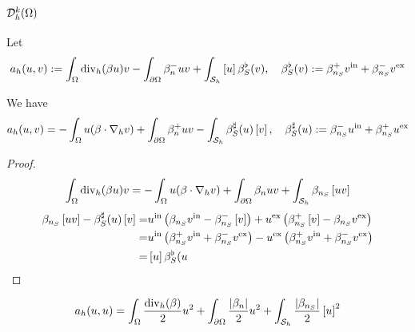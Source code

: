 \subsection{$\mathcal{D}^k_h(\Omega)$}\label{subsec:}
%
Let
%
\begin{equation}\label{eq:}
a_h(u,v) := \int_{\Omega}\operatorname{div}_h(\beta u) v - \int_{\partial\Omega} \beta_n^- uv+ \int_{\mathcal S_h}\left[u\right]\beta_S^{\flat}(v),
\quad \beta_S^{\flat}(v) := \beta_{n_S}^{+}v^{\rm in} + \beta_{n_S}^{-}v^{\rm ex}
\end{equation}
%
\begin{lemma}\label{lemma:}
We have
%
\begin{equation}\label{eq:}
a_h(u,v) = - \int_{\Omega}u (\beta\cdot\nabla_h v) + \int_{\partial\Omega} \beta_n^+ uv  - \int_{\mathcal S_h}\beta_S^{\sharp}(u) \left[v\right],
\quad \beta_S^{\sharp}(u) := \beta_{n_S}^{-}u^{\rm in} + \beta_{n_S}^{+}u^{\rm ex}\end{equation}
%
\end{lemma}
%
\begin{proof}
%
\begin{align*}
\int_{\Omega}\operatorname{div}_h(\beta u) v = - \int_{\Omega}u (\beta\cdot\nabla_h v) + \int_{\partial\Omega} \beta_n uv + \int_{\mathcal S_h}\beta_{n_S} \left[uv\right]
\end{align*}
%
%
\begin{align*}
\beta_{n_S} \left[uv\right] - \beta_S^{\sharp}(u) \left[v\right]
=&  u^{\rm in}\left(\beta_{n_S} v^{\rm in}-\beta_{n_S}^{-}\left[v\right] \right) + u^{\rm ex}\left(\beta_{n_S}^{+}\left[v\right]-\beta_{n_S}v^{\rm ex}\right)\\
=& u^{\rm in}\left(\beta_{n_S}^+ v^{\rm in}+\beta_{n_S}^{-}v^{\rm ex} \right) - u^{\rm ex}\left(\beta_{n_S}^+ v^{\rm in}+\beta_{n_S}^{-}v^{\rm ex} \right)\\
=& \left[u\right] \beta_S^{\flat}(u
\end{align*}
%
\end{proof}
%
\begin{corollary}\label{cor:}
%
\begin{equation}\label{eq:}
a_h(u,u) = \int_{\Omega}\frac{\operatorname{div}_h(\beta)}{2} u^2 + \int_{\partial\Omega} \frac{\left|\beta_n\right|}{2} u^2+ \int_{\mathcal S_h}\frac{\left|\beta_{n_S}\right|}{2}\left[u\right]^2
\end{equation}
%
\end{corollary}
%
